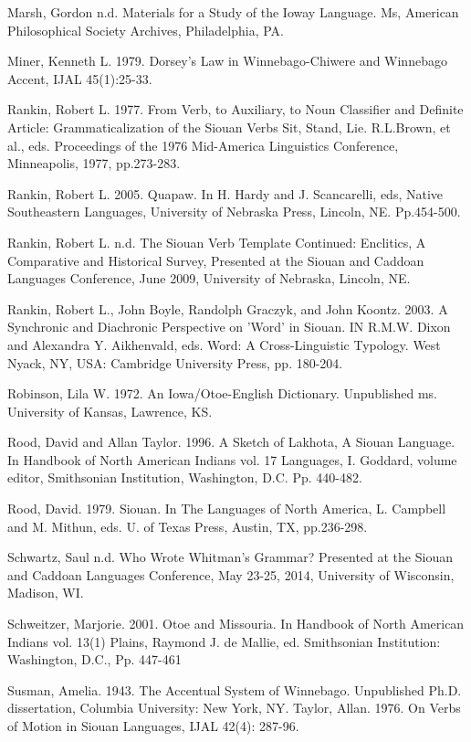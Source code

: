 \documentclass[output=paper]{LSP/langsci}
\begin{document}
\begin{reflist}
Marsh, Gordon  n.d.  Materials for a Study of the Ioway Language.  Ms, American Philosophical Society Archives, Philadelphia, PA.  
  									    
Miner, Kenneth L. 1979. Dorsey's Law in Winnebago-Chiwere and Winnebago Accent, IJAL 45(1):25-33.   	
	            	 					
Rankin, Robert L.  1977.  From Verb, to Auxiliary, to Noun Classifier and Definite Article: Grammaticalization of the Siouan Verbs Sit, Stand, Lie. R.L.Brown, et al., eds. Proceedings of the 1976 Mid-America Linguistics Conference, Minneapolis, 1977, pp.273-283.    
  
Rankin, Robert L.  2005.  Quapaw. In H. Hardy and J. Scancarelli, eds, Native Southeastern Languages, University of Nebraska Press, Lincoln, NE.  Pp.454-500.		         	
             
Rankin, Robert L.  n.d.  The Siouan Verb Template Continued: Enclitics, A Comparative and Historical Survey, Presented at the Siouan and Caddoan Languages Conference, June 2009, 	University of Nebraska, Lincoln, NE. 
  
Rankin, Robert L., John Boyle, Randolph Graczyk, and John Koontz. 2003.  A Synchronic and Diachronic Perspective on 'Word' in Siouan.  IN R.M.W. Dixon and Alexandra Y. Aikhenvald, eds. Word:  A Cross-Linguistic Typology. West Nyack, NY, USA:  Cambridge University Press, pp. 180-204.							     					     			          
 
Robinson, Lila W. 1972.  An Iowa/Otoe-English Dictionary. Unpublished ms. University of Kansas, Lawrence, KS.  
 
Rood, David and Allan Taylor. 1996.  A Sketch of Lakhota, A Siouan Language. In Handbook of North American Indians vol. 17 Languages, I. Goddard, volume editor, Smithsonian Institution, Washington, D.C.  Pp. 440-482.  	

Rood, David.  1979.  Siouan. In The Languages of North America, L. Campbell and M. Mithun, eds.  U. of Texas Press, Austin, TX, pp.236-298.  
			          		           			           
Schwartz, Saul  n.d. Who Wrote Whitman's Grammar?  Presented at the Siouan and Caddoan Languages Conference, May 23-25, 2014, University of Wisconsin, Madison, WI.	  
 
Schweitzer, Marjorie. 2001. Otoe and Missouria. In Handbook of North American Indians vol. 13(1) Plains,  Raymond J. de Mallie, ed.  Smithsonian Institution:  Washington, D.C., Pp. 447-461           
 
 Susman, Amelia. 1943. The Accentual System of Winnebago. Unpublished Ph.D. dissertation, Columbia University: New York, NY.  								              
Taylor, Allan. 1976.  On Verbs of Motion in Siouan Languages, IJAL 42(4): 287-96. 	            
 

\end{reflist}
\end{document}
